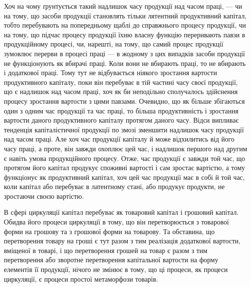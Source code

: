 Хоч на чому ґрунтується такий надлишок часу продукції над часом
праці, — чи на тому, що засоби продукції становлять тільки лятентний
продуктивний капітал, тобто перебувають на попередньому щаблі до
справжнього процесу продукції, чи на тому, що підчас процесу продукції
їхню власну функцію переривають павзи в продукційному процесі, чи,
нарешті, на тому, що самий процес продукції зумовлює перерви в процесі
праці — в жодному з цих випадків засоби продукції не функціонують як
вбирачі праці. Коли вони не вбирають праці, то не вбирають і додаткової
праці. Тому тут не відбувається ніякого зростання вартости продуктивного
капіталу, поки він перебуває в тій частині часу своєї продукції, що є надлишок
над часом праці, хоч як би неподільно сполучалось здійснення процесу
зростання вартости з цими павзами. Очевидно, що як більше збігаються один
з одним час продукції та час праці, то більша продуктивність і зростання
вартости даного продуктивного капіталу протягом даного часу. Відси
випливає тенденція капіталістичної продукції по змозі зменшити надлишок
часу продукції над часом праці. Але хоч час продукції капіталу й може
відхилитись від його часу праці, а проте, він завжди охоплює цей час,
і надлишок першого над другим є навіть умова продукційного процесу.
Отже, час продукції є завжди той час, що протягом його капітал продукує
споживні вартості і сам зростає вартістю, а тому функціонує як
продуктивний капітал, хоч цей час продукції має в собі й той час, коли
капітал або перебуває в латентному стані, або продукує продукти, не
зростаючи своєю вартістю.

В сфері циркуляції капітал перебуває як товаровий капітал і грошовий
капітал. Обидва його процеси циркуляції в тому, що він перетворюється
з товарової форми на грошову та з грошової форми на товарову. Та
обставина, що перетворення товару на гроші є тут разом з тим реалізація
додаткової вартости, вміщеної в товарі, і що перетворення грошей
на товар є разом з тим перетворення або зворотне перетворення капітальної
вартости на форму елементів її продукції, нічого не змінює в
тому, що ці процеси, як процеси циркуляції, є процеси простої метаморфози
товарів.

